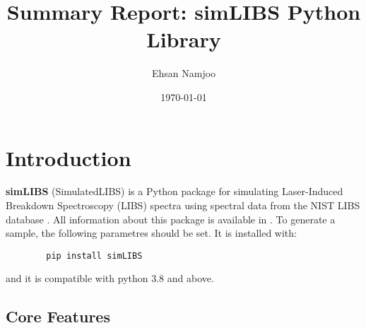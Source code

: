 \documentclass[12pt,a4paper]{article}
\title{Summary Report: simLIBS Python Library}
\author{Ehsan Namjoo}
\date{\today}
\begin{document}
	
	\maketitle
	\tableofcontents
	\newpage
	
	\section{Introduction}
	\textbf{simLIBS} (SimulatedLIBS) is a Python package for simulating Laser-Induced Breakdown Spectroscopy (LIBS) spectra using spectral data from the NIST LIBS database \cite{NIST_LIBS}. All information about this package is available in \cite{simLIBS2024}. To generate a sample, the following parametres should be set. It is installed with:
	\begin{verbatim}
		pip install simLIBS
	\end{verbatim}
		and it is compatible with python 3.8 and above. 

	\subsection{Core Features}
	
\end{document}
